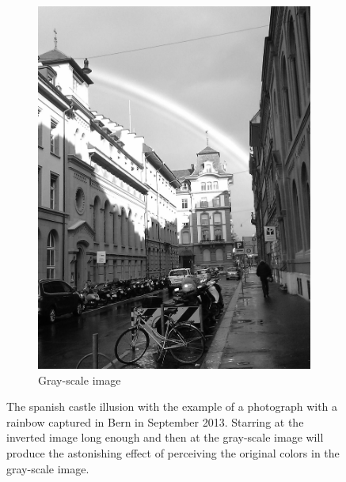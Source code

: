 \documentclass[a4paper]{article}
\begin{document}
\begin{figure}[H]
\begin{subfigure}[h]{0.48\textwidth}
		\includegraphics[width=\textwidth]{rainbow_gray}
		\caption*{Gray-scale image}
	\end{subfigure}	
\caption{The spanish castle illusion with the example of a photograph with a rainbow captured in Bern in September 2013. Starring at the inverted image long enough and then at the gray-scale image will produce the astonishing effect of perceiving the original colors in the gray-scale image.}
\label{fig:rainbow}
\end{figure}
\end{document}
